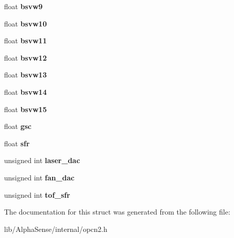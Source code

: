 \begin{DoxyCompactItemize}
\mbox{\label{structAlphaSense_1_1ConfigVars_a86bd0f1c478d7ad9eec4254f25efd843}} 
float {\bfseries bsvw9}
\item 
\mbox{\label{structAlphaSense_1_1ConfigVars_a45ddd3174f9a278cf8b5f8b1fbbdb838}} 
float {\bfseries bsvw10}
\item 
\mbox{\label{structAlphaSense_1_1ConfigVars_a88708c3489fab33b07bfec6f022c3ba5}} 
float {\bfseries bsvw11}
\item 
\mbox{\label{structAlphaSense_1_1ConfigVars_a17c44551add486f71b87afca5caced77}} 
float {\bfseries bsvw12}
\item 
\mbox{\label{structAlphaSense_1_1ConfigVars_ab8f3d2d61b25fd5cad663435ebfc1e14}} 
float {\bfseries bsvw13}
\item 
\mbox{\label{structAlphaSense_1_1ConfigVars_a76623cc15dbcc7ccad1063ac245514a0}} 
float {\bfseries bsvw14}
\item 
\mbox{\label{structAlphaSense_1_1ConfigVars_a6fb6fb0fa11fa1b624eb48629277ac90}} 
float {\bfseries bsvw15}
\item 
\mbox{\label{structAlphaSense_1_1ConfigVars_a4361261f97f5fc0004af323b46731096}} 
float {\bfseries gsc}
\item 
\mbox{\label{structAlphaSense_1_1ConfigVars_a98aa70364bc5dbcc5ee3d6fc8b73fa34}} 
float {\bfseries sfr}
\item 
\mbox{\label{structAlphaSense_1_1ConfigVars_a1b25b5651b905024604c6d67e0180b44}} 
unsigned int {\bfseries laser\+\_\+dac}
\item 
\mbox{\label{structAlphaSense_1_1ConfigVars_a3e0eca8cb3af7c2584144d20a28cdb58}} 
unsigned int {\bfseries fan\+\_\+dac}
\item 
\mbox{\label{structAlphaSense_1_1ConfigVars_ac564be115705a40022fa1fea6f6090b9}} 
unsigned int {\bfseries tof\+\_\+sfr}
\end{DoxyCompactItemize}


The documentation for this struct was generated from the following file\+:\begin{DoxyCompactItemize}
\item 
lib/\+Alpha\+Sense/internal/opcn2.\+h\end{DoxyCompactItemize}
